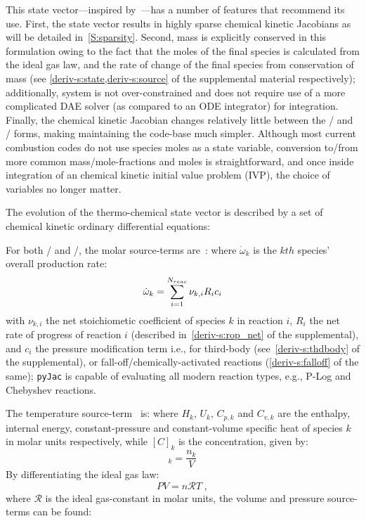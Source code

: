 \documentclass[12pt,number,sort&compress,preprint]{elsarticle}
\begin{document}
This state vector---inspired by~\cite{SCHWER2002270}---has a number of features that recommend its use.
First, the state vector results in highly sparse chemical kinetic Jacobians as will be detailed in~\cref{S:sparsity}.
Second, mass is explicitly conserved in this formulation owing to the fact that the moles of the final species is calculated from the ideal gas law, and the rate of change of the final species from conservation of mass (see \cref{deriv-s:state,deriv-s:source} of the supplemental material respectively); additionally, system is not over-constrained and does not require use of a more complicated DAE solver (as compared to an ODE integrator) for integration.
Finally, the chemical kinetic Jacobian changes relatively little between the \conp/ and \conv/ forms, making maintaining the code-base much simpler.
Although most current combustion codes do not use species moles as a state variable, conversion to\slash from more common mass\slash mole-fractions and moles is straightforward, and once inside integration of an chemical kinetic initial value problem (IVP), the choice of variables no longer matter.

The evolution of the thermo-chemical state vector is described by a set of chemical kinetic ordinary differential equations:

For both \conp/ and \conv/, the molar source-terms are~\cite{TurnsStephenR2012Aitc}:
where $\dot{\omega}_k$ is the $kth$ species' overall production rate:
\begin{equation}
 \dot{\omega}_{k} = \sum_{i=1}^{\nr/} \nu_{k, i} R_{i} c_{i}
\end{equation}
with $\nu_{k, i}$ the net stoichiometic coefficient of species $k$ in reaction $i$, $R_{i}$ the net rate of progress of reaction $i$ (described in~\cref{deriv-s:rop_net} of the supplemental), and $c_{i}$ the pressure modification term i.e., for third-body (see~\cref{deriv-s:thdbody} of the supplemental), or fall-off\slash chemically-activated reactions (\cref{deriv-s:falloff} of the same); \texttt{pyJac} is capable of evaluating all modern reaction types, e.g., P-Log and Chebyshev reactions.

The temperature source-term~\cite{TurnsStephenR2012Aitc} is:
where $H_k$, $U_k$, $C_{p,k}$ and $C_{v, k}$ are the enthalpy, internal energy, constant-pressure and constant-volume specific heat of species $k$ in molar units respectively, while $[C]_{k}$ is the concentration, given by:
\begin{equation}
 [C]_{k} = \frac{n_{k}}{V}
\end{equation}
By differentiating the ideal gas law:
\begin{equation}
 PV = n\mathcal{R}T \;,
\end{equation}
where $\mathcal{R}$ is the ideal gas-constant in molar units, the volume and pressure source-terms can be found:
\end{document}
